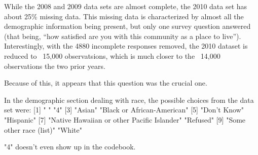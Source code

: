 \documentclass{article}\usepackage{graphicx, color}
\begin{document}
While the 2008 and 2009 data sets are almost complete, the 2010 data set has about 25\% missing data. This missing data is characterized by almost all the demographic information being present, but only one survey question answered (that being, ``how satisfied are you with this community as a place to live''). Interestingly, with the 4880 incomplete responses removed, the 2010 dataset is reduced to ~15,000 observatsions, which is much closer to the ~14,000 observations the two prior years. 
 

Because of this, it appears that this question was the crucial one. 




In the demographic section dealing with race, the possible choices from the data set were: 
[1] " "                                         "4"                                        
 [3] "Asian"                                     "Black or African-American"                
 [5] "Don't Know"                                "Hispanic"                                 
 [7] "Native Hawaiian or other Pacific Islander" "Refused"                                  
 [9] "Some other race (list)"                    "White"            
 
 "4" doesn't even show up in the codebook. 
\end{document}

